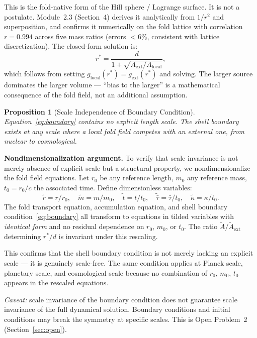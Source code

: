 \documentclass[12pt]{article}
\newtheorem{proposition}{Proposition}
\newcommand{\taubar}{\bar{\tau}}
\begin{document}
This is the fold-native form of the Hill sphere / Lagrange surface.
It is not a postulate. Module~2.3 \cite{mod23} (Section~4) derives it analytically
from $1/r^2$ and superposition, and confirms it numerically on the
fold lattice with correlation $r=0.994$ across five mass ratios
(errors $<6\%$, consistent with lattice discretization).
The closed-form solution is:
\begin{equation}
  r^* = \frac{d}{1 + \sqrt{A_{\mathrm{ext}}/A_{\mathrm{local}}}},
  \label{eq:hill}
\end{equation}
which follows from setting $g_{\mathrm{local}}(r^*) = g_{\mathrm{ext}}(r^*)$
and solving. The larger source dominates the larger volume ---
``bias to the larger'' is a mathematical consequence of the fold
field, not an additional assumption.

\begin{proposition}[Scale Independence of Boundary Condition]
  Equation~\eqref{eq:boundary} contains no explicit length scale.
  The shell boundary exists at any scale where a local fold field
  competes with an external one, from nuclear to cosmological.
\end{proposition}

\textbf{Nondimensionalization argument.}
To verify that scale invariance is not merely absence of explicit
scale but a structural property, we nondimensionalize the fold
field equations. Let $r_0$ be any reference length, $m_0$ any
reference mass, $t_0 = r_0/c$ the associated time. Define
dimensionless variables:
\begin{equation}
  \tilde{r} = r/r_0, \quad
  \tilde{m} = m/m_0, \quad
  \tilde{t} = t/t_0, \quad
  \tilde{\taubar} = \taubar/t_0, \quad
  \tilde{\kappa} = \kappa/t_0.
\end{equation}
The fold transport equation, accumulation equation, and shell
boundary condition~\eqref{eq:boundary} all transform to equations
in tilded variables with \emph{identical form} and no residual
dependence on $r_0$, $m_0$, or $t_0$.
The ratio $\tilde{A}/\tilde{A}_{\mathrm{ext}}$ determining $r^*/d$
is invariant under this rescaling.

This confirms that the shell boundary condition is not merely
lacking an explicit scale --- it is genuinely scale-free.
The same condition applies at Planck scale, planetary scale,
and cosmological scale because no combination of $r_0$, $m_0$, $t_0$
appears in the rescaled equations.

\textit{Caveat:} scale invariance of the boundary condition does
not guarantee scale invariance of the full dynamical solution.
Boundary conditions and initial conditions may break the symmetry
at specific scales. This is Open Problem~2 (Section~\ref{sec:open}).
\end{document}
